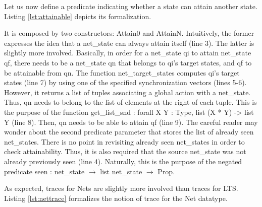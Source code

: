 		Let us now define a predicate indicating whether a state can attain another state. Listing \ref{lst:attainable}
	depicts its formalization.
			
				
	
		
	\noindent It is composed by two constructors: \textsf{Attain0} and \textsf{AttainN}. Intuitively,
	the former expresses the idea that a \textsf{net\_state} can always attain itself (line 3).
	The latter is slightly more involved. Basically, in order for a \textsf{net\_state} \textsf{qi}
	to attain \textsf{net\_state} \textsf{qf}, there needs to be a \textsf{net\_state} \textsf{qn}
	that belongs to \textsf{qi}'s target states, and \textsf{qf} to be attainable from \textsf{qn}.
	The function \textsf{net\_target\_states} computes \textsf{qi}'s target states (line 7) by using
	one of the specified synchronization vectors (lines 5-6). 
	However, it returns a list of tuples associating a global \textsf{action} with a \textsf{net\_state}.
	Thus, \textsf{qn} needs to belong to the list of elements at the right of each tuple.	
	This is the purpose of the function 
	\textsf{get\_list\_snd : forall X Y : Type, list (X * Y) -> list Y}	(line 8). Then, 
	\textsf{qn} needs to be able to attain \textsf{qf} (line 9). The careful reader may wonder
	about the second predicate parameter that stores the list of already seen \textsf{net\_state}s. 
	There is no point in revisiting already seen \textsf{net\_state}s in order to check 
	attainability. Thus, it is also required that the source \textsf{net\_state} was not already
	previously seen (line 4). Naturally, this is the purpose of the negated predicate
	\textsf{seen : net\_state $\rightarrow$ list net\_state $\rightarrow$ Prop}.
	
			
		As expected, traces for \textsf{Net}s are slightly more involved than traces for \textsc{LTS}. 
	Listing \ref{lst:nettrace} formalizes the notion of trace for the \textsf{Net} datatype.
			

			
	
